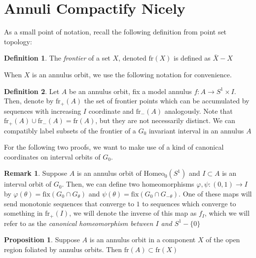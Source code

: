 \documentclass[10pt, oneside]{article}
\newcommand{\homeoS}{\text{Homeo}_0(S^1)}
\theoremstyle{definition}
\newtheorem{defn}{Definition}
\newtheorem{rem}{Remark}
\newtheorem{prop}{Proposition}
\theoremstyle{definition}
\begin{document}
\section{Annuli Compactify Nicely}
As a small point of notation, recall the following definition from point set topology:
\begin{defn}
    The {\it frontier} of a set $X$, denoted $\text{fr}(X)$ is defined as $\bar{X}-X$
\end{defn}

When $X$ is an annulus orbit, we use the following notation for convenience.

\begin{defn}
    Let $A$ be an annulus orbit, fix a model annulus $f:A\to S^1\times I$. Then, denote by $\text{fr}_+(A)$ the set of frontier points which can be accumulated by sequences with increasing $I$ coordinate and $\text{fr}_-(A)$ analogously. Note that $\text{fr}_+(A)\cup\text{fr}_-(A) = \text{fr}(A)$, but they are not necessarily distinct. We can compatibly label subsets of the frontier of a $G_0$ invariant interval in an annulus $A$
\end{defn}

For the following two proofs, we want to make use of a kind of canonical coordinates on interval orbits of $G_0$.

\begin{rem}
    Suppose $A$ is an annulus orbit of $\homeoS$ and $I\subset A$ is an interval orbit of $G_0$. Then, we can define two homeomorphisms $\varphi, \psi:(0,1) \to I$ by $\varphi(\theta) = \text{fix}(G_0\cap G_\theta)$ and $\psi(\theta) = \text{fix}(G_0\cap G_{-\theta})$. One of these maps will send monotonic sequences that converge to $1$ to sequences which converge to something in $\text{fr}_+(I)$, we will denote the inverse of this map as $f_I$, which we will refer to as the {\it canonical homeomorphism between $I$ and $S^1 - \{0\}$}
\end{rem}

\begin{prop}
    Suppose $A$ is an annulus orbit in a component $X$ of the open region foliated by annulus orbits. Then $\text{fr}(A)\subset \text{fr}(X)$
\end{prop}
\end{document}
